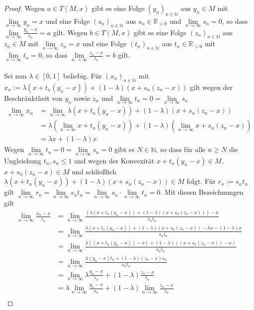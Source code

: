 \begin{compactenum}[(i)]
\begin{proof}
Wegen $a\in T(M,x)$ gibt es eine Folge $(y_n)_{n\in\mathbb N}$ aus $y_n\in M$ mit $\lim\limits_{n\to\infty} y_n=x$ und eine Folge $(s_n)_{n\in\mathbb N}$ aus $s_n\in\mathbb R_{>0}$ und $\lim\limits_{n\to\infty}s_n = 0$, so dass $\lim\limits_{n\to\infty} \frac{y_n-x}{s_n}=a$ gilt. Wegen $b\in T(M,x)$ gibt es eine Folge $(z_n)_{n\in\mathbb N}$ aus $z_n\in M$ mit $\lim\limits_{n\to\infty} z_n=x$ und eine Folge $(t_n)_{n\in\mathbb N}$ aus $t_n\in\mathbb R_{>0}$ mit $\lim\limits_{n\to\infty}t_n = 0$, so dass $\lim\limits_{n\to\infty} \frac{z_n-x}{t_n}=b$ gilt.\\\\
Sei nun $\lambda\in[0,1]$ beliebig. Für $(x_n)_{n\in\mathbb N}$ mit $x_n:=\lambda(x+t_n(y_n-x))+(1-\lambda)(x+s_n(z_n-x))$ gilt wegen der Beschränktheit von $y_n$ sowie $z_n$ und $\lim\limits_{n\to\infty}t_n = 0=\lim\limits_{n\to\infty}s_n$
\begin{align*}
\lim\limits_{n\to\infty} x_n &=\lim\limits_{n\to\infty} \lambda(x+t_n(y_n-x))+(1-\lambda)(x+s_n(z_n-x))\\&=\lambda(\lim\limits_{n\to\infty}x+t_n(y_n-x))+(1-\lambda)(\lim\limits_{n\to\infty} x+s_n(z_n-x))\\&=\lambda x+(1-\lambda)x
\end{align*}
Wegen $\lim\limits_{n\to\infty} t_n=0=\lim\limits_{n\to\infty} s_n=0$ gibt es $N\in\mathbb N$, so dass für alle $n\geq N$ die Ungleichung $t_n,s_n\leq 1$ und wegen der Konvexität $x+t_n(y_n-x)\in M$,  $x+s_n(z_n-x)\in M$ und schließlich $\lambda(x+t_n(y_n-x))+(1-\lambda)(x+s_n(z_n-x))\in M$ folgt. Für $r_n:=s_nt_n$ gilt $\lim\limits_{n\to\infty} r_n=\lim\limits_{n\to\infty} s_nt_n=\lim\limits_{n\to\infty} s_n\cdot \lim\limits_{n\to\infty}t_n=0$. Mit diesen Bezeichnungen gilt \begin{align*}\lim\limits_{n\to\infty}\frac{x_n-x}{r_n}&=\lim\limits_{n\to\infty}\frac{(\lambda(x+t_n(y_n-x))+(1-\lambda)(x+s_n(z_n-x)))-x}{s_nt_n}\\&=\lim\limits_{n\to\infty}\frac{\lambda(x+t_n(y_n-x))+(1-\lambda)(x+s_n(z_n-x))-\lambda x-(1-\lambda)x}{s_nt_n}\\&=\lim\limits_{n\to\infty}\frac{\lambda((x+t_n(y_n-x))-x)+(1-\lambda)((x+s_n(z_n-x))-x)}{s_nt_n}\\&=\lim\limits_{n\to\infty}\frac{\lambda(y_n-x)t_n+(1-\lambda)(z_n-x)s_n}{s_nt_n}\\&=\lim\limits_{n\to\infty}\lambda \frac{y_n-x}{s_n}+(1-\lambda)\frac{z_n-x}{t_n}\\&=\lambda \lim\limits_{n\to\infty}\frac{y_n-x}{s_n}+(1-\lambda)\lim\limits_{n\to\infty}\frac{z_n-x}{t_n}\\

\end{align*}
\end{proof}
\end{compactenum}
